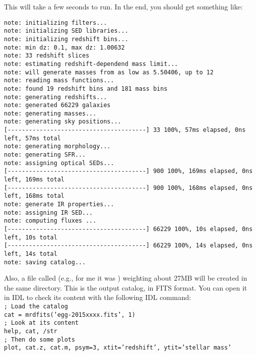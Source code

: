 \documentclass[12pt,a4paper]{article}
\begin{document}
This will take a few seconds to run. In the end, you should get something like:
\begin{verbatim}
note: initializing filters...
note: initializing SED libraries...
note: initializing redshift bins...
note: min dz: 0.1, max dz: 1.00632
note: 33 redshift slices
note: estimating redshift-dependend mass limit...
note: will generate masses from as low as 5.50406, up to 12
note: reading mass functions...
note: found 19 redshift bins and 181 mass bins
note: generating redshifts...
note: generated 66229 galaxies
note: generating masses...
note: generating sky positions...
[---------------------------------------] 33 100%, 57ms elapsed, 0ns left, 57ms total
note: generating morphology...
note: generating SFR...
note: assigning optical SEDs...
[---------------------------------------] 900 100%, 169ms elapsed, 0ns left, 169ms total
[---------------------------------------] 900 100%, 168ms elapsed, 0ns left, 168ms total
note: generate IR properties...
note: assigning IR SED...
note: computing fluxes ...
[---------------------------------------] 66229 100%, 10s elapsed, 0ns left, 10s total
[---------------------------------------] 66229 100%, 14s elapsed, 0ns left, 14s total
note: saving catalog...
\end{verbatim}

Also, a file called  (e.g., for me it was ) weighting about 27MB will be created in the same directory. This is the output catalog, in FITS format. You can open it in IDL to check its content with the following IDL command: \\[0.5cm]
\noindent \texttt{\color{gray}; Load the catalog} \\
\noindent \texttt{cat = mrdfits({\color{DodgerBlue}'egg-2015xxxx.fits'}, {\color{red}1})} \\
\noindent \texttt{\color{gray}; Look at its content} \\
\noindent \texttt{{\color{Green}help}, cat, /str} \\
\noindent \texttt{\color{gray}; Then do some plots} \\
\noindent \texttt{{\color{Green}plot}, cat.z, cat.m, psym={\color{red}3}, xtit={\color{DodgerBlue}'redshift'}, ytit={\color{DodgerBlue}'stellar mass'}} \\
\end{document}
